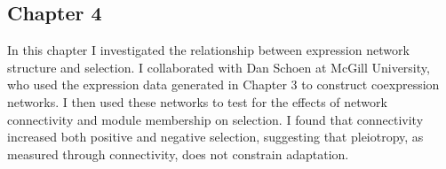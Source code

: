 \subsection{Chapter 4}
	In this chapter I investigated the relationship between expression network structure and selection. I collaborated with Dan Schoen at McGill University, who used the expression data generated in Chapter 3 to construct coexpression networks. I then used these networks to test for the effects of network connectivity and module membership on selection. I found that connectivity increased both positive and negative selection, suggesting that pleiotropy, as measured through connectivity, does not constrain adaptation. 
